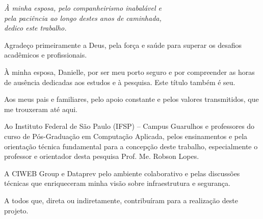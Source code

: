 \begin{dedicatoria}
   \vspace*{\fill}
   \begin{flushright}
   \textit{À minha esposa, pelo companheirismo inabalável e \\
   pela paciência ao longo destes anos de caminhada, \\
   dedico este trabalho.}
   
   \end{flushright}
\end{dedicatoria}

\begin{agradecimentos}

Agradeço primeiramente a Deus, pela força e saúde para superar os desafios acadêmicos e profissionais.

À minha esposa, Danielle, por ser meu porto seguro e por compreender as horas de ausência dedicadas aos estudos e à pesquisa. Este título também é seu.

Aos meus pais e familiares, pelo apoio constante e pelos valores transmitidos, que me trouxeram até aqui.

Ao Instituto Federal de São Paulo (IFSP) – Campus Guarulhos e professores do curso de Pós-Graduação em Computação Aplicada, pelos ensinamentos e pela orientação técnica fundamental para a concepção deste trabalho, especialmente o professor e orientador desta pesquisa Prof. Me. Robson Lopes.

A CIWEB Group e Dataprev pelo ambiente colaborativo e pelas discussões técnicas que enriqueceram minha visão sobre infraestrutura e segurança.

A todos que, direta ou indiretamente, contribuíram para a realização deste projeto.

\end{agradecimentos}
